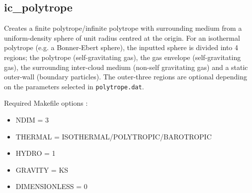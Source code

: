 \documentclass[a4paper]{article}
\newcommand{\var}[1]{\texttt{#1}}
\begin{document}
\newpage


\subsection{ic\_polytrope}
Creates a finite polytrope/infinite polytrope with surrounding medium from a uniform-density sphere of unit radius centred at the origin.  For an isothermal polytrope (e.g. a Bonner-Ebert sphere), the inputted sphere is divided into 4 regions; the polytrope (self-gravitating gas), the gas envelope (self-gravitating gas), the surrounding inter-cloud medium (non-self gravitating gas) and a static outer-wall (boundary particles).  The outer-three regions are optional depending on the parameters selected in \var{polytrope.dat}. \newline

\noindent Required Makefile options :
\begin{itemize}
\item NDIM = 3
\item THERMAL = ISOTHERMAL/POLYTROPIC/BAROTROPIC
\item HYDRO = 1
\item GRAVITY = KS
\item DIMENSIONLESS = 0
\end{itemize}

\vspace{0.1cm}
\end{document}
